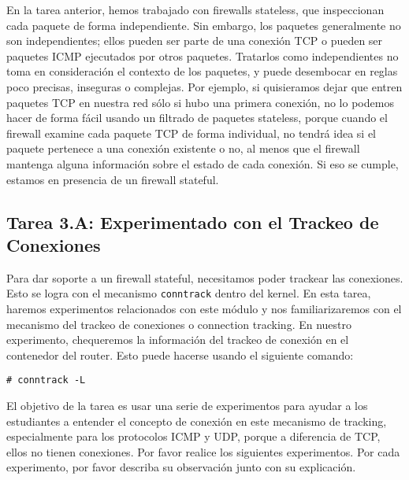 En la tarea anterior, hemos trabajado con firewalls stateless, que inspeccionan cada paquete de forma independiente. Sin embargo, los paquetes generalmente no son independientes; ellos pueden ser parte de una conexión TCP o pueden ser paquetes ICMP ejecutados por otros paquetes. Tratarlos como independientes no toma en consideración el contexto de los paquetes, y puede desembocar en reglas poco precisas, inseguras o complejas.
Por ejemplo, si quisieramos dejar que entren paquetes TCP en nuestra red sólo si hubo una primera conexión, no lo podemos hacer de forma fácil usando un filtrado de paquetes stateless, porque cuando el firewall examine cada paquete TCP de forma individual, no tendrá idea si el paquete pertenece a una conexión existente o no, al menos que el firewall mantenga alguna información sobre el estado de cada conexión.
Si eso se cumple, estamos en presencia de un firewall stateful.

\subsection{Tarea 3.A: Experimentado con el Trackeo de Conexiones} 

Para dar soporte a un firewall stateful, necesitamos poder trackear las conexiones.
Esto se logra con el mecanismo \texttt{conntrack} dentro del kernel.
En esta tarea, haremos experimentos relacionados con este módulo y nos familiarizaremos con el mecanismo del trackeo de conexiones o connection tracking.
En nuestro experimento, chequeremos la información del trackeo de conexión en el contenedor del router. Esto puede hacerse usando el siguiente comando:

\begin{lstlisting}
# conntrack -L
\end{lstlisting}

El objetivo de la tarea es usar una serie de experimentos para ayudar a los estudiantes a entender el concepto de conexión en este mecanismo de tracking, especialmente para los protocolos ICMP y UDP, porque a diferencia de TCP, ellos no tienen conexiones.
Por favor realice los siguientes experimentos. Por cada experimento, por favor describa su observación junto con su explicación.

